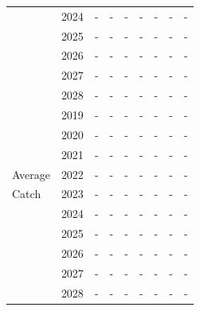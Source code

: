 \documentclass[12pt,]{article}
\begin{document}
\begin{table}[ht]
{\begin{tabular}{l|cc|>{\centering}p{.7in}c|>{\centering}p{.7in}c|>{\centering}p{.7in}c}
   & 2024 & - & - & - & - & - & - & - \\ 
   & 2025 & - & - & - & - & - & - & - \\ 
   & 2026 & - & - & - & - & - & - & - \\ 
   & 2027 & - & - & - & - & - & - & - \\ 
   & 2028 & - & - & - & - & - & - & - \\ 
   \hline
 & 2019 & - & - & - & - & - & - & - \\ 
   & 2020 & - & - & - & - & - & - & - \\ 
   & 2021 & - & - & - & - & - & - & - \\ 
  Average & 2022 & - & - & - & - & - & - & - \\ 
  Catch & 2023 & - & - & - & - & - & - & - \\ 
   & 2024 & - & - & - & - & - & - & - \\ 
   & 2025 & - & - & - & - & - & - & - \\ 
   & 2026 & - & - & - & - & - & - & - \\ 
   & 2027 & - & - & - & - & - & - & - \\ 
   & 2028 & - & - & - & - & - & - & - \\ 
   \hline
\end{tabular}
}
\end{table}
\end{document}
